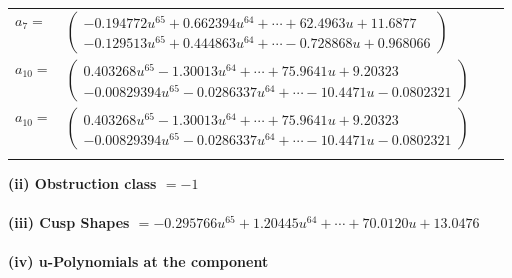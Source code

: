 \documentclass[1p]{elsarticle_modified}
\theoremstyle{definition}
\begin{document}
\begin{tabular}{m{7pt} m{180pt} m{7pt} m{180pt} }
\flushright $a_{7}=$&$\begin{pmatrix}-0.194772 u^{65}+0.662394 u^{64}+\cdots+62.4963 u+11.6877\\-0.129513 u^{65}+0.444863 u^{64}+\cdots-0.728868 u+0.968066\end{pmatrix}$ \\
\flushright $a_{10}=$&$\begin{pmatrix}0.403268 u^{65}-1.30013 u^{64}+\cdots+75.9641 u+9.20323\\-0.00829394 u^{65}-0.0286337 u^{64}+\cdots-10.4471 u-0.0802321\end{pmatrix}$\\ \flushright $a_{10}=$&$\begin{pmatrix}0.403268 u^{65}-1.30013 u^{64}+\cdots+75.9641 u+9.20323\\-0.00829394 u^{65}-0.0286337 u^{64}+\cdots-10.4471 u-0.0802321\end{pmatrix}$\\&\end{tabular}
\flushleft \textbf{(ii) Obstruction class $= -1$}\\~\\
\flushleft \textbf{(iii) Cusp Shapes $= -0.295766 u^{65}+1.20445 u^{64}+\cdots+70.0120 u+13.0476$}\\~\\
\newpage\renewcommand{\arraystretch}{1}
\flushleft \textbf{(iv) u-Polynomials at the component}\newline \\
\end{document}
